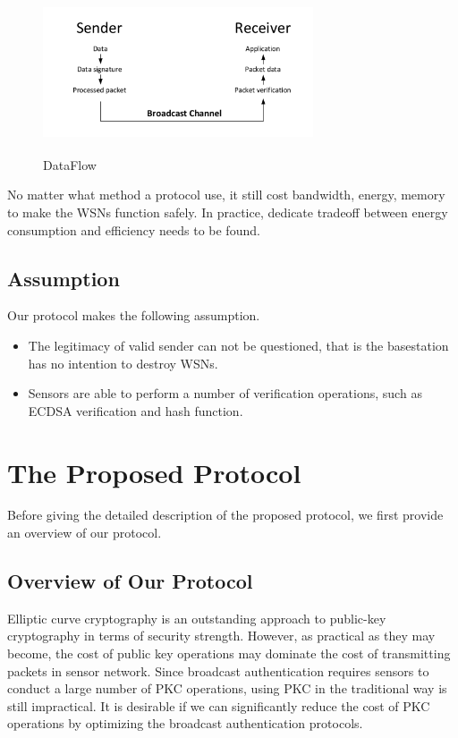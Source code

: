 \documentclass{sig-alternate-05-2015}
\begin{document}
\begin{figure}
\centering
\includegraphics[width=8cm,height=4cm]{DataFlow.pdf}\\
\caption{DataFlow}\label{} 
\end{figure}
No matter what method  a protocol use,
it still cost bandwidth, energy, memory to make the WSNs function safely. In practice, dedicate tradeoff between energy consumption and efficiency needs to be found.

\subsection{Assumption}
Our protocol makes the following assumption.
\begin{itemize}
    \item The legitimacy of valid sender can not be questioned, that is the basestation has no intention to destroy WSNs.
    \item  
    Sensors are able to perform a number of verification operations, such as ECDSA verification and hash function.
\end{itemize}
\section{The Proposed Protocol}
Before giving the detailed description of the proposed protocol, we first provide an overview of our protocol.
\subsection{Overview of Our Protocol}
Elliptic curve cryptography is an outstanding approach to public-key cryptography in terms of security strength. However, as practical as they may become, the cost of public key operations may dominate the cost of transmitting packets in sensor network. Since broadcast authentication requires sensors to conduct a large number of PKC operations, using PKC in the traditional way is still impractical. It is desirable if we can significantly reduce the cost of PKC operations by optimizing the broadcast authentication protocols.
\end{document}
